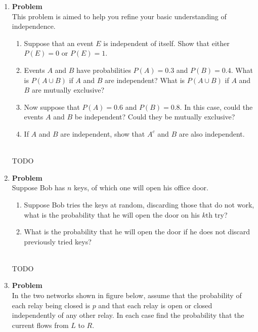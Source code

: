\documentclass[12pt]{article}
\newenvironment{Ex}{\textbf{Problem}\vspace{.75em}\\}{}
\begin{document}
\begin{enumerate}
\begin{Ex}
\begin{solution}
\begin{enumerate}
          engineers on the committee, so the probability that Two
          particular mechanical engineers cannot be together on the
          committee is $\frac{3}{10}$.
        \end{enumerate}
      \end{solution}
    \end{Ex}
  \item
    \begin{Ex}
      This problem is aimed to help you refine your basic
      understanding of independence.
      \begin{enumerate}
      \item Suppose that an event $E$ is independent of itself. Show
        that either $P(E) = 0$ or $P(E) = 1$.
      \item Events $A$ and $B$ have probabilities $P(A)=0.3$ and
        $P(B)=0.4$. What is $P(A \cup B)$ if $A$ and $B$ are
        independent? What is $P(A \cup B)$ if $A$ and $B$ are
        mutually exclusive?
      \item Now suppose that $P(A) = 0.6$ and $P(B) = 0.8$. In this
        case, could the events $A$ and $B$ be independent? Could they
        be mutually exclusive?
      \item If $A$ and $B$ are independent, show that $A^c$ and $B$
        are also independent.
      \end{enumerate}
      \begin{solution} \hfill \\
        {\huge TODO}
      \end{solution}
    \end{Ex}
  \item
    \begin{Ex}
      Suppose Bob has $n$ keys, of which one will open his office
      door.
      \begin{enumerate}
      \item Suppose Bob tries the keys at random, discarding those
        that do not work, what is the probability that he will open
        the door on his $k\text{th}$ try?
      \item What is the probability that he will open the door if he
        does not discard previously tried keys?
      \end{enumerate}
      \begin{solution} \hfill \\
        {\huge TODO}
      \end{solution}
    \end{Ex}
  \item
    \begin{Ex}
      In the two networks shown in figure below, assume that the
      probability of each relay being closed is $p$ and that each
      relay is open or closed independently of any other relay. In
      each case find the probability that the current flows from $L$
      to $R$.


\end{Ex}
\end{enumerate}
\end{document}
